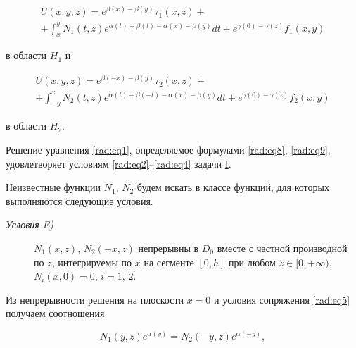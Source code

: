 \begin{multline}

\label{rad:eq8}

U(x,y,z)= e^{\beta(x)-\beta(y)} \tau_1(x,z) + \\ + \int _x^y N_1(t,z) e^{\alpha(t)+\beta(t)-\alpha(x)-\beta(y)} dt 

+ e^{\gamma(0)-\gamma(z)} f_1(x,y) 

\end{multline}

в области $H_1$ и

\begin{multline}\label{rad:eq9}

U(x,y,z)= e^{\beta(-x)-\beta(y)} \tau_2(x,z) + \\ + \int ^x_{-y} N_2(t,z) e^{\alpha(t)+\beta(-t)-\alpha(x)-\beta(y)} dt 

 + e^{\gamma(0)-\gamma(z)} f_2(x,y) 

 \end{multline}

в области $H_2$.



Решение уравнения  \eqref{rad:eq1}, определяемое формулами \eqref{rad:eq8}, \eqref{rad:eq9}, удовлетворяет условиям \eqref{rad:eq2}--\eqref{rad:eq4} задачи \hyperlink{rad:task:I}{I}. 

Неизвестные функции $N_1$, $N_2$ будем искать в классе функций, для которых выполняются следующие условия.



\begin{description}

\item[\sl Условия E\rm)]  \hypertarget{rad:E}{} 

$N_1(x,z)$, $N_2(-x,z)$ непрерывны в $D_0$ вместе с частной производной по $z$, интегрируемы по $x$ на сегменте $[0, h]$ при любом $z\in[0,+\infty)$, $N_i(x,0)=0$, $i=1,\,2$.

\end{description}



Из непрерывности решения на плоскости $x=0$ и условия сопряжения \eqref{rad:eq5} получаем соотношения

\begin{equation}

\label{rad:eq10}

N_1(y,z) e^{\alpha(y)} = N_2(-y,z) e^{\alpha(-y)},

\end{equation}



